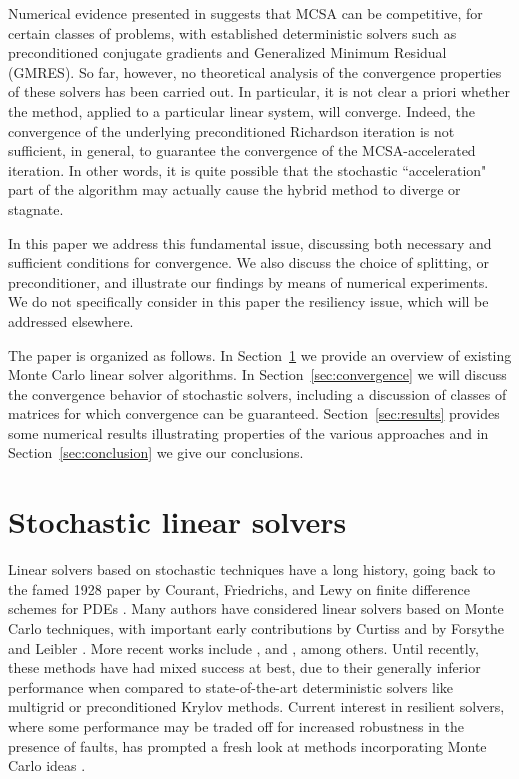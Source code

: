 \documentclass[times]{nlaauth}
\begin{document}
Numerical evidence presented in \cite{EMSH2014} suggests
that MCSA can be competitive, for certain classes of problems,
with established deterministic solvers such as preconditioned
conjugate gradients and Generalized Minimum Residual (GMRES). So far, however, no theoretical analysis
of the convergence properties of these solvers has been carried out. In
particular, it is not clear a priori whether the method, applied to a
particular linear system, will converge.
Indeed, the convergence of the underlying preconditioned Richardson
iteration is not sufficient, in general, to guarantee the convergence
of the MCSA-accelerated iteration. In other words, it is quite possible
that the stochastic ``acceleration" part of the algorithm may actually
cause the hybrid method to diverge or stagnate.

In this paper we address this fundamental issue,
discussing both necessary and sufficient conditions for convergence.
We also discuss the choice of splitting, or preconditioner, and illustrate
our findings by means of numerical experiments.
We do not specifically
consider in this paper the resiliency issue, which will be addressed
elsewhere.

The paper is organized as follows.
In Section~\ref{sec:mcls} we provide an overview of existing Monte Carlo
linear solver algorithms.
In Section~\ref{sec:convergence} we will discuss the convergence behavior
of stochastic solvers, including a discussion of classes of matrices for
which convergence can be guaranteed.
Section~\ref{sec:results} provides some numerical results illustrating
properties of the various approaches and in Section~\ref{sec:conclusion} we
give our conclusions.


\section{Stochastic linear solvers}
\label{sec:mcls}

Linear solvers based on stochastic techniques have a
long history,
going back to the famed 1928 paper by Courant, Friedrichs, and Lewy
on finite difference schemes for PDEs \cite{CFL}.
Many authors have considered linear solvers based on Monte Carlo
techniques, with important early contributions by
Curtiss \cite{Curtiss} and by Forsythe and Leibler \cite{FL50}.
More recent works include \cite{AADBTW2005,Hal1994},
and \cite{DA1998}, among others.
Until recently,
these methods have had mixed success at best,
due to their generally inferior performance when compared to state-of-the-art
deterministic solvers like multigrid or preconditioned Krylov methods.
Current interest in resilient solvers, where some performance may be
traded off for increased robustness in the presence of faults, has prompted a fresh
look at methods incorporating Monte Carlo ideas
\cite{EMSH2014,ESW2013,Slattery2013}.
\end{document}
